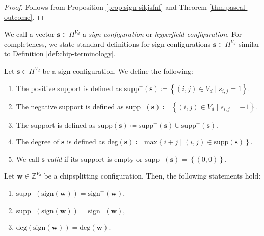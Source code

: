 \begin{proof}
    Follows from Proposition \ref{prop:sign-sikjsfnf} and Theorem \ref{thm:pascal-outcome}.
\end{proof}

We call a vector \( \mathbf{s} \in H^{V_d} \) a \emph{sign configuration} or \emph{hyperfield configuration}. For completeness, we state standard definitions for sign configurations \( \mathbf{s} \in H^{V_d} \) similar to Definition \ref{def:chip-terminology}.

\begin{definition}
    Let \( \mathbf{s} \in H^{V_d} \) be a sign configuration. We define the following:
    \begin{enumerate}
        \item The positive support is defined as \( \mathrm{supp}^+(\mathbf{s}) \coloneqq \left\{ (i,j) \in V_d \mid s_{i,j} = 1 \right\} \).
        \item The negative support is defined as \( \mathrm{supp}^-(\mathbf{s}) \coloneqq \left\{ (i,j) \in V_d \mid s_{i,j} = -1 \right\} \).
        \item The support is defined as \( \mathrm{supp}(\mathbf{s}) \coloneqq \mathrm{supp}^+(\mathbf{s}) \cup \mathrm{supp}^-(\mathbf{s}) \).
        \item The degree of \( \mathbf{s} \) is defined as \( \mathrm{deg}(\mathbf{s}) \coloneqq \mathrm{max}\left\{ i + j \mid (i,j) \in \mathrm{supp}(\mathbf{s}) \right\} \).
        \item We call \( \mathbf{s} \) \emph{valid} if its support is empty or \( \mathrm{supp}^-(\mathbf{s}) = \left\{ (0,0) \right\} \).
    \end{enumerate}
\end{definition}

\begin{lemma}
    Let \( \mathbf{w} \in \mathbb{Z}^{V_d} \) be a chipsplitting configuration. Then, the following statements hold:
    \begin{enumerate}
        \item \( \mathrm{supp}^+(\mathrm{sign}(\mathbf{w})) = \mathrm{sign}^+(\mathbf{w}) \),
        \item \( \mathrm{supp}^-(\mathrm{sign}(\mathbf{w})) = \mathrm{sign}^-(\mathbf{w}) \),
        \item \( \mathrm{deg}(\mathrm{sign}(\mathbf{w})) = \mathrm{deg}(\mathbf{w}) \).
    \end{enumerate}
\end{lemma}

